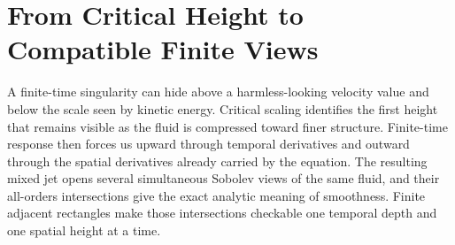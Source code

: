 
\section{From Critical Height to Compatible Finite Views}\label{sec:FromCriticalHeightToCompatibleFiniteViews}

A finite-time singularity can hide above a harmless-looking velocity value and below the scale seen by kinetic energy.
Critical scaling identifies the first height that remains visible as the fluid is compressed toward finer structure.
Finite-time response then forces us upward through temporal derivatives and outward through the spatial derivatives already carried by the equation.
The resulting mixed jet opens several simultaneous Sobolev views of the same fluid, and their all-orders intersections give the exact analytic meaning of smoothness.
Finite adjacent rectangles make those intersections checkable one temporal depth and one spatial height at a time.








